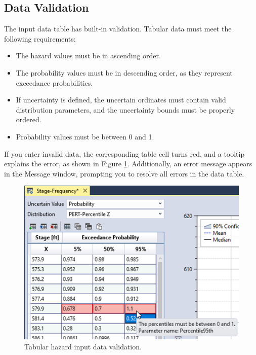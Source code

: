 \documentclass[
]{book}
\begin{document}
\hypertarget{data-validation}{%
\subsection{Data Validation}\label{data-validation}}

The input data table has built-in validation. Tabular data must meet the following requirements:

\begin{itemize}
\item
  The hazard values must be in ascending order.
\item
  The probability values must be in descending order, as they represent exceedance probabilities.
\item
  If uncertainty is defined, the uncertain ordinates must contain valid distribution parameters, and the uncertainty bounds must be properly ordered.
\item
  Probability values must be between 0 and 1.
\end{itemize}

If you enter invalid data, the corresponding table cell turns red, and a tooltip explains the error, as shown in Figure \ref{fig:figure-70}. Additionally, an error message appears in the Message window, prompting you to resolve all errors in the data table.

\begin{figure}

{\centering \includegraphics{images/figure70} 

}

\caption{Tabular hazard input data validation.}\label{fig:figure-70}
\end{figure}
\end{document}
